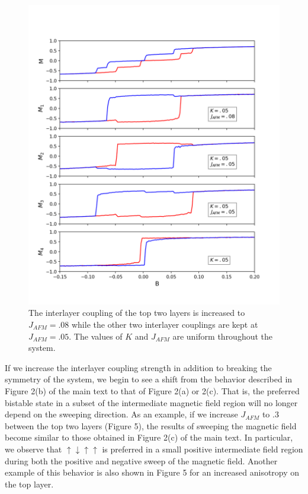 \documentclass[10pt]{article}
\begin{document}
\begin{figure}[!htb]
\includegraphics[width=\textwidth]{j_increase.png}
\caption{The interlayer coupling of the top two layers is increased to $J_{AFM} = .08$ while the other two interlayer couplings are kept at $J_{AFM} = .05$. The values of
$K$ and $J_{AFM}$ are uniform throughout the system. }
\end{figure}

\pagebreak

\pagebreak
If we increase the interlayer coupling strength in addition to breaking the symmetry of the system, we begin to see a shift from the behavior described in Figure 2(b) of the main text to that of Figure 2(a) or 2(c). That is,
the preferred bistable state in a subset of the intermediate magnetic field region will no longer depend on the sweeping direction. As an example, if we increase $J_{AFM}$ to $.3$ between the
top two layers (Figure 5), the results of sweeping the magnetic field become similar to those obtained in Figure 2(c) of the main text.
In particular, we observe that $\uparrow \downarrow \uparrow \uparrow$ is preferred in a small positive intermediate field region during both the positive
and negative sweep of the magnetic field. Another example of this behavior is also shown in Figure 5 for an increased anisotropy on the top layer.
\end{document}
